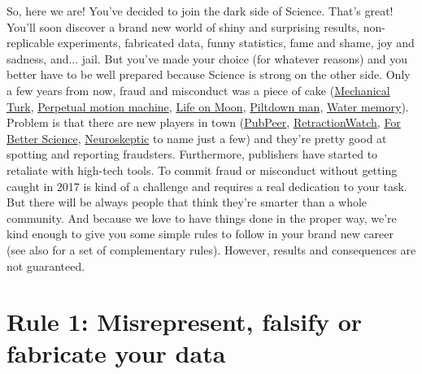 \documentclass[a4paper,10pt,onecolumn]{article}
\begin{document}
So, here we are! You've decided to join the dark side of Science. That's great!
You'll soon discover a brand new world of shiny and surprising results,
non-replicable experiments, fabricated data, funny statistics, fame and shame,
joy and sadness, and... jail. But you've made your choice (for whatever
reasons) and you better have to be well prepared because Science is strong on
the other side. Only a few years from now, fraud and misconduct was a piece of
cake (\href{https://en.wikipedia.org/wiki/The_Turk}{Mechanical Turk},
\href{https://en.wikipedia.org/wiki/Charles_Redheffer}{Perpetual motion
  machine}, \href{https://en.wikipedia.org/wiki/Great_Moon_Hoax}{Life on Moon},
\href{https://en.wikipedia.org/wiki/Piltdown_Man}{Piltdown man},
\href{https://en.wikipedia.org/wiki/Water_memory}{Water memory}). Problem is
that there are new players in town (\href{https://pubpeer.com}{PubPeer},
\href{http://retractionwatch.com}{RetractionWatch},
\href{https://forbetterscience.com}{For Better Science},
\href{http://blogs.discovermagazine.com/neuroskeptic/}{Neuroskeptic} to name
just a few) and they're pretty good at spotting and reporting fraudsters.
Furthermore, publishers have started to retaliate with high-tech tools. To
commit fraud or misconduct without getting caught in 2017 is kind of a
challenge and requires a real dedication to your task. But there will be always
people that think they're smarter than a whole community. And because we love
to have things done in the proper way, we're kind enough to give you some
simple rules to follow in your brand new career (see also \citep{timmer:2012}
for a set of complementary rules). However, results and consequences are not
guaranteed.

\section*{Rule 1: Misrepresent, falsify or fabricate your data}
\end{document}
